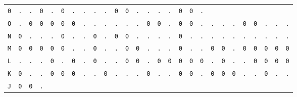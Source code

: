 \begin{figure}[H]
\begin{center}
{\begin{tabular}{c|cccccccccccccccccccccccccc}
				\texttt{0} & \texttt{.} & \texttt{.} & \texttt{0} &
				\texttt{.} & \texttt{0} & \texttt{.} & \texttt{.} &
				\texttt{.} & \texttt{.} & \texttt{0} & \texttt{0} &
				\texttt{.} & \texttt{.} & \texttt{.} & \texttt{.} &
				\texttt{0} & \texttt{0} & \texttt{.}                             \\
				\texttt{O} & \texttt{.} & \texttt{0} & \texttt{0} &
				\texttt{0} & \texttt{0} & \texttt{0} & \texttt{.} &
				\texttt{.} & \texttt{.} & \texttt{.} & \texttt{.} &
				\texttt{.} & \texttt{0} & \texttt{0} & \texttt{.} &
				\texttt{0} & \texttt{0} & \texttt{.} & \texttt{.} &
				\texttt{.} & \texttt{.} & \texttt{0} & \texttt{0} &
				\texttt{.} & \texttt{.} & \texttt{.}                             \\
				\texttt{N} & \texttt{0} & \texttt{.} & \texttt{.} &
				\texttt{.} & \texttt{0} & \texttt{.} & \texttt{.} &
				\texttt{0} & \texttt{.} & \texttt{0} & \texttt{0} &
				\texttt{.} & \texttt{.} & \texttt{.} & \texttt{.} &
				\texttt{0} & \texttt{.} & \texttt{.} & \texttt{.} &
				\texttt{.} & \texttt{.} & \texttt{.} & \texttt{.} &
				\texttt{.} & \texttt{.} & \texttt{.}                             \\
				\texttt{M} & \texttt{0} & \texttt{0} & \texttt{0} &
				\texttt{0} & \texttt{0} & \texttt{.} & \texttt{.} &
				\texttt{0} & \texttt{.} & \texttt{.} & \texttt{0} &
				\texttt{0} & \texttt{.} & \texttt{.} & \texttt{.} &
				\texttt{0} & \texttt{.} & \texttt{.} & \texttt{0} &
				\texttt{0} & \texttt{.} & \texttt{0} & \texttt{0} &
				\texttt{0} & \texttt{0} & \texttt{0}                             \\
				\texttt{L} & \texttt{.} & \texttt{.} & \texttt{.} &
				\texttt{0} & \texttt{.} & \texttt{0} & \texttt{.} &
				\texttt{0} & \texttt{.} & \texttt{.} & \texttt{0} &
				\texttt{0} & \texttt{.} & \texttt{0} & \texttt{0} &
				\texttt{0} & \texttt{0} & \texttt{0} & \texttt{.} &
				\texttt{0} & \texttt{.} & \texttt{.} & \texttt{0} &
				\texttt{0} & \texttt{0} & \texttt{0}                             \\
				\texttt{K} & \texttt{0} & \texttt{.} & \texttt{.} &
				\texttt{0} & \texttt{0} & \texttt{0} & \texttt{.} &
				\texttt{.} & \texttt{0} & \texttt{.} & \texttt{.} &
				\texttt{.} & \texttt{0} & \texttt{.} & \texttt{.} &
				\texttt{0} & \texttt{0} & \texttt{.} & \texttt{0} &
				\texttt{0} & \texttt{0} & \texttt{.} & \texttt{.} &
				\texttt{0} & \texttt{.} & \texttt{.}                             \\
				\texttt{J} & \texttt{0} & \texttt{0} & \texttt{.} &

\end{tabular}}
\end{center}
\end{figure}

